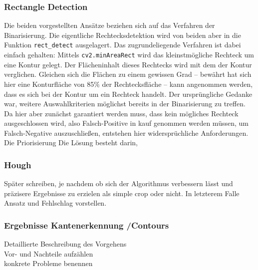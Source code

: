 \subsubsection{Rectangle Detection}

Die beiden vorgestellten Ansätze beziehen sich auf das Verfahren der Binarisierung. Die eigentliche Rechtecksdetektion wird von beiden aber in die Funktion \verb|rect_detect| ausgelagert. Das zugrundeliegende Verfahren ist dabei einfach gehalten: Mittels \verb|cv2.minAreaRect| wird das kleinstmögliche Rechteck um eine Kontur gelegt. Der Flächeninhalt dieses Rechtecks wird mit dem der Kontur verglichen. Gleichen sich die Flächen zu einem gewissen Grad -- bewährt hat sich hier eine Konturfläche von 85\% der Rechtecksfläche -- kann angenommen werden, dass es sich bei der Kontur um ein Rechteck handelt.
Der ursprüngliche Gedanke war, weitere Auswahlkriterien möglichst bereits in der Binarisierung zu treffen. Da hier aber zunächst garantiert werden muss, dass kein mögliches Rechteck ausgeschlossen wird, also Falsch-Positive in kauf genommen werden müssen, um Falsch-Negative auszuschließen, entstehen hier widersprüchliche Anforderungen. Die Priorisierung   Die Lösung besteht darin, 

\subsubsection{Hough}

Später schreiben, je nachdem ob sich der Algorithmus verbessern lässt und präzisere Ergebnisse zu erzielen als simple crop oder nicht. In letzterem Falle Ansatz und Fehlschlag vorstellen.\\

\subsubsection{Ergebnisse Kantenerkennung /Contours}
Detaillierte Beschreibung des Vorgehens\\
Vor- und Nachteile aufzählen\\
konkrete Probleme benennen\\
